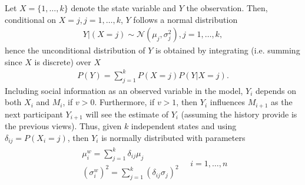 \documentclass[9pt,a4paper,twocolumn,lineno]{article}
\begin{document}
Let $X=\{1,\dots,k\}$ denote the state variable and $Y$ the observation. Then, conditional on $X=j, j=1,\dots,k$, $Y$ follows a normal distribution
\begin{align*}
	Y|(X=j)  \sim \mathcal{N} (\mu_j,\sigma^2_j), j=1,\dots,k,
\end{align*}
hence the unconditional distribution of $Y$ is obtained by integrating (i.e. summing since $X$ is discrete) over $X$
\begin{align*}
	P(Y) = \sum_{j=1}^k P(X=j)P(Y|X=j).
\end{align*}
Including social information as an observed variable in the model, $Y_i$ depends on both $X_i$ and $M_i$, if $v>0$. Furthermore, if $v>1$, then $Y_i$ influences $M_{i+1}$ as the next participant $Y_{i+1}$ will see the estimate of $Y_i$ (assuming the history provide is the previous views).
%
%
%
%
Thus, given $k$ independent states and using $\delta_{ij} = P(X_i=j)$, then $Y_i$ is normally distributed with parameters
\begin{align}
\begin{array}{l}
	\mu^w_i = \sum_{j=1}^k \delta_{ij} \mu_j \\
	(\sigma^w_i)^2 = \sum_{j=1}^k \left(\delta_{ij} \sigma_j\right)^2
\end{array}
\quad i=1,\dots,n \label{eq: weighted Gaussian parameters}
\end{align}
\end{document}
